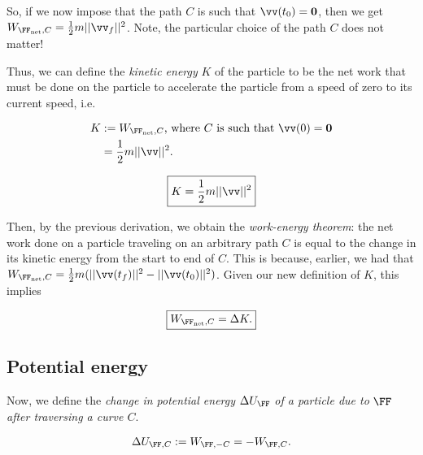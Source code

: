 \documentclass{article}
\begin{document}
So, if we now impose that the path $C$ is such that $\vv(t_0) = \mathbf{0}$, then we get $W_{\FF_{\text{net}}, C} = \frac{1}{2}m||\vv_f||^2$. Note, the particular choice of the path $C$ does not matter!

Thus, we can define the \textit{kinetic energy} $K$ of the particle to be the net work that must be done on the particle to accelerate the particle from a speed of zero to its current speed, i.e.

\begin{align*}
    K &:= W_{\FF_{\text{net}}, C} \text{, where $C$ is such that $\vv(0) = \mathbf{0}$} \\
       &= \frac{1}{2}m||\vv||^2.
\end{align*}

\begin{align*}
    \boxed
    {
        K = \frac{1}{2}m||\vv||^2
    }
\end{align*}

Then, by the previous derivation, we obtain the \textit{work-energy theorem}: the net work done on a particle traveling on an arbitrary path $C$ is equal to the change in its kinetic energy from the start to end of $C$. This is because, earlier, we had that $W_{\FF_{\text{net}}, C} = \frac{1}{2} m (||\vv(t_f)||^2 - ||\vv(t_0)||^2)$. Given our new definition of $K$, this implies

\begin{align*}
    \boxed
    {
        W_{\FF_{\text{net}}, C} = \Delta K.
    }
\end{align*}

\subsection*{Potential energy}

Now, we define the \textit{change in potential energy} $\Delta U_{\FF}$ \textit{of a particle due to} $\FF$ \textit{after traversing a curve $C$}. 

\begin{align*}
    \Delta U_{\FF, C} := W_{\FF, -C} = -W_{\FF, C}.
\end{align*}
\end{document}
